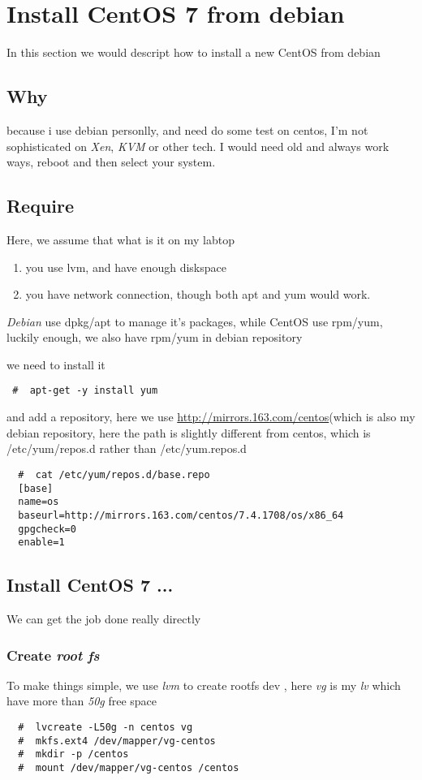 \chapter{Install CentOS 7 from debian}
In this section we would descript how to install a new CentOS from debian
\section{Why}
because i use debian personlly, and need do some test on centos, I'm not sophisticated on \emph{Xen}, \emph{KVM} or other tech. I would need old and always work ways, reboot and then select your system.
\section{Require}
Here, we assume {that what is it on my labtop}
\begin{enumerate}
\item you use lvm, and have enough diskspace
\item you have network connection, though both {\ttfamily apt } and {\ttfamily yum} would work. 
\end{enumerate}

\emph{Debian} use {\ttfamily dpkg/apt} to manage it's packages, while CentOS use {\ttfamily rpm/yum}, luckily enough, we also have {\ttfamily rpm/yum} in debian repository

we need to install it
\begin{lstlisting}
 #  apt-get -y install yum 
\end{lstlisting}
and add a repository,  here we use \url{http://mirrors.163.com/centos}(which is also my debian repository, here the path is slightly different from centos, which is {\ttfamily /etc/yum/repos.d} rather than {\ttfamily /etc/yum.repos.d}
\begin{lstlisting}
  #  cat /etc/yum/repos.d/base.repo
  [base]
  name=os
  baseurl=http://mirrors.163.com/centos/7.4.1708/os/x86_64
  gpgcheck=0
  enable=1
\end{lstlisting}

\section{Install CentOS 7 ... }
We can get the job done really directly
\subsection{Create \emph{root fs}}
To make things simple, we use \emph{lvm} to create rootfs dev , here \emph{vg} is my \emph{lv} which have more than \emph{50g} free space
\begin{lstlisting}
  #  lvcreate -L50g -n centos vg
  #  mkfs.ext4 /dev/mapper/vg-centos
  #  mkdir -p /centos
  #  mount /dev/mapper/vg-centos /centos
\end{lstlisting}

